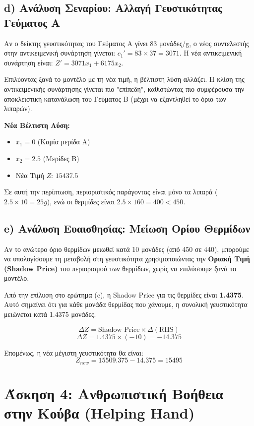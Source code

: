 \documentclass[12pt, a4paper]{article}
\begin{document}
\subsection*{d) Ανάλυση Σεναρίου: Αλλαγή Γευστικότητας Γεύματος Α}
Αν ο δείκτης γευστικότητας του Γεύματος Α γίνει 83 μονάδες/g, ο νέος συντελεστής στην αντικειμενική συνάρτηση γίνεται: $c_1' = 83 \times 37 = 3071$.
Η νέα αντικειμενική συνάρτηση είναι: $Z' = 3071 x_1 + 6175 x_2$.

Επιλύοντας ξανά το μοντέλο με τη νέα τιμή, η βέλτιστη λύση αλλάζει. Η κλίση της αντικειμενικής συνάρτησης γίνεται πιο "επίπεδη", καθιστώντας πιο συμφέρουσα την αποκλειστική κατανάλωση του Γεύματος Β (μέχρι να εξαντληθεί το όριο των λιπαρών).

\textbf{Νέα Βέλτιστη Λύση:}
\begin{itemize}
    \item $x_1 = 0$ (Καμία μερίδα Α)
    \item $x_2 = 2.5$ (Μερίδες Β)
    \item Νέα Τιμή $Z$: $15437.5$
\end{itemize}
Σε αυτή την περίπτωση, περιοριστικός παράγοντας είναι μόνο τα λιπαρά ($2.5 \times 10 = 25g$), ενώ οι θερμίδες είναι $2.5 \times 160 = 400 < 450$.

\subsection*{e) Ανάλυση Ευαισθησίας: Μείωση Ορίου Θερμίδων}
Αν το ανώτερο όριο θερμίδων μειωθεί κατά 10 μονάδες (από 450 σε 440), μπορούμε να υπολογίσουμε τη μεταβολή στη γευστικότητα χρησιμοποιώντας την \textbf{Οριακή Τιμή (Shadow Price)} του περιορισμού των θερμίδων, χωρίς να επιλύσουμε ξανά το μοντέλο.

Από την επίλυση στο ερώτημα (c), η Shadow Price για τις θερμίδες είναι \textbf{1.4375}.
Αυτό σημαίνει ότι για κάθε μονάδα θερμίδας που χάνουμε, η συνολική γευστικότητα μειώνεται κατά 1.4375 μονάδες.

$$ \Delta Z = \text{Shadow Price} \times \Delta (\text{RHS}) $$
$$ \Delta Z = 1.4375 \times (-10) = -14.375 $$

Επομένως, η νέα μέγιστη γευστικότητα θα είναι:
$$ Z_{new} = 15509.375 - 14.375 = 15495 $$

\section*{Άσκηση 4: Ανθρωπιστική Βοήθεια στην Κούβα (Helping Hand)}
\end{document}
